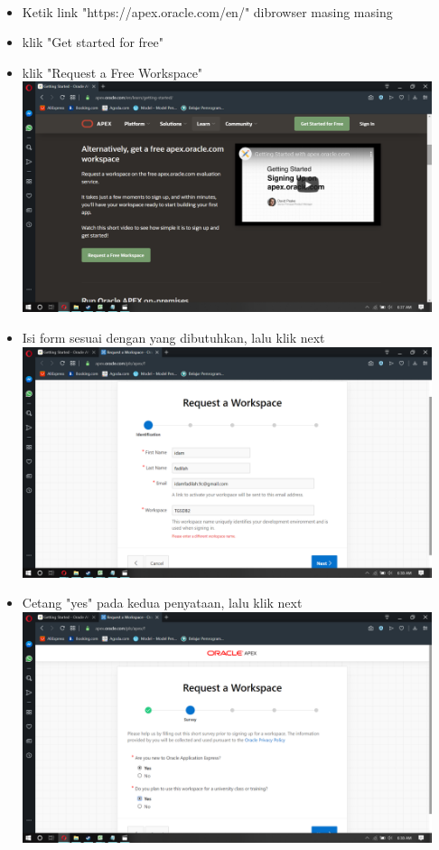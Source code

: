 \documentclass[a4paper,12pt]{report}
\begin{document}
\paragraph{}
\begin{itemize}
	\item Ketik link "https://apex.oracle.com/en/" dibrowser masing masing	
	\item klik "Get started for free"
	\item klik "Request a Free Workspace"\\	\includegraphics[width=12cm]{gambar/Screenshot (106).png} 
	\item Isi form sesuai dengan yang dibutuhkan, lalu klik next\\	\includegraphics[width=12cm]{gambar/Screenshot (108).png} 
	\item Cetang "yes" pada kedua penyataan, lalu klik next\\	\includegraphics[width=12cm]{gambar/Screenshot (109).png} 

\end{itemize}
\end{document}
